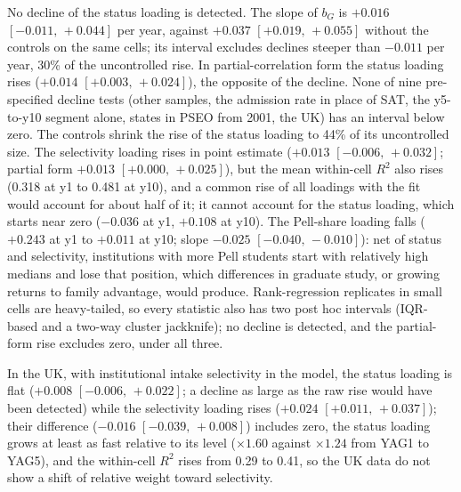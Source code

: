 \documentclass[11pt]{article}
\newcommand{\ci}[2]{$[#1,\allowbreak\,#2]$}
\begin{document}
No decline of the status loading is detected. The slope of $b_G$ is $+0.016$ \ci{-0.011}{+0.044} per year, against
$+0.037$ \ci{+0.019}{+0.055} without the controls on the same cells; its interval excludes declines steeper than
$-0.011$ per year, 30\% of the uncontrolled rise. In partial-correlation form the status loading rises ($+0.014$
\ci{+0.003}{+0.024}), the opposite of the decline. None of nine pre-specified decline tests (other samples, the
admission rate in place of SAT, the y5-to-y10 segment alone, states in PSEO from 2001, the UK) has an interval below
zero. The controls shrink the rise of the status loading to 44\% of its uncontrolled size. The selectivity loading
rises in point estimate ($+0.013$ \ci{-0.006}{+0.032}; partial form $+0.013$ \ci{+0.000}{+0.025}), but the mean
within-cell $R^2$ also rises (0.318 at y1 to 0.481 at y10), and a common rise of all loadings with the fit would
account for about half of it; it cannot account for the status loading, which starts near zero ($-0.036$ at y1,
$+0.108$ at y10). The Pell-share loading falls ($+0.243$ at y1 to $+0.011$ at y10; slope $-0.025$ \ci{-0.040}{-0.010}):
net of status and selectivity, institutions with more Pell students start with relatively high medians and lose
that position, which differences in graduate study, or growing returns to family advantage, would produce. Rank-regression replicates in small cells are
heavy-tailed, so every statistic also has two post hoc intervals (IQR-based and a two-way cluster jackknife); no
decline is detected, and the partial-form rise excludes zero, under all three.

In the UK, with institutional intake selectivity in the model, the status loading is flat ($+0.008$
\ci{-0.006}{+0.022}; a decline as large as the raw rise would have been detected) while the selectivity loading
rises ($+0.024$ \ci{+0.011}{+0.037}); their difference ($-0.016$ \ci{-0.039}{+0.008}) includes zero, the status loading
grows at least as fast relative to its level ($\times1.60$ against $\times1.24$ from YAG1 to YAG5), and the within-cell
$R^2$ rises from 0.29 to 0.41, so the UK data do not show a shift of relative weight toward selectivity.
\end{document}
